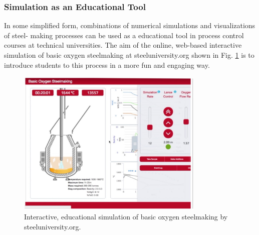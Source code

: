 \subsubsection{Simulation as an Educational Tool}

In some simplified form, combinations of numerical simulations and visualizations of steel- making processes can be used as a educational tool in process control courses at technical universities. The aim of the online, web-based interactive simulation of basic oxygen steelmaking at steeluniversity.org shown in Fig. \ref{fig:steeluniversity} is to introduce students to this process in a more fun and engaging way.

\begin{figure}[!ht]
	\label{fig:steeluniversity}
	\centering
	\includegraphics[width=0.8\textwidth]{figures/steeluniversity.jpg}
	\caption{Interactive, educational simulation of basic oxygen steelmaking by steeluniversity.org.}
\end{figure}




